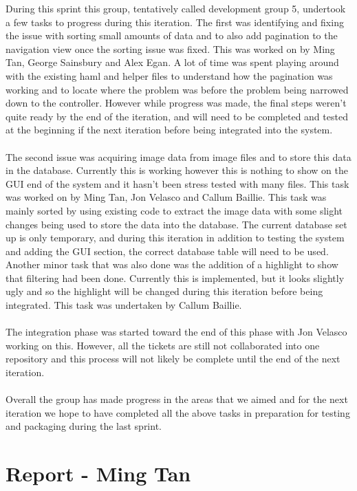 \documentclass{article}
\begin{document}
During this sprint this group, tentatively called development group 5, undertook a few tasks to progress during this iteration. The first was identifying and fixing the issue with sorting small amounts of data and to also add pagination to the navigation view once the sorting issue was fixed. This was worked on by Ming Tan, George Sainsbury and Alex Egan. A lot of time was spent playing around with the existing haml and helper files to understand how the pagination was working and to locate where the problem was before the problem being narrowed down to the controller. However while progress was made, the final steps weren’t quite ready by the end of the iteration, and will need to be completed and tested at the beginning if the next iteration before being integrated into the system.\\
\\
The second issue was acquiring image data from image files and to store this data in the database. Currently this is working however this is nothing to show on the GUI end of the system and it hasn’t been stress tested with many files. This task was worked on by Ming Tan, Jon Velasco and Callum Baillie. This task was mainly sorted by using existing code to extract the image data with some slight changes being used to store the data into the database. The current database set up is only temporary, and during this iteration in addition to testing the system and adding the GUI section, the correct database table will need to be used. Another minor task that was also done was the addition of a highlight to show that filtering had been done. Currently this is implemented, but it looks slightly ugly and so the highlight will be changed during this iteration before being integrated. This task was undertaken by Callum Baillie. \\
\\
The integration phase was started toward the end of this phase with Jon Velasco working on this. However, all the tickets are still not collaborated into one repository and this process will not likely be complete until the end of the next iteration.\\
\\
Overall the group has made progress in the areas that we aimed and for the next iteration we hope to have completed all the above tasks in preparation for testing and packaging during the last sprint.\\

\newpage{}

\section{Report - Ming Tan}
\end{document}
